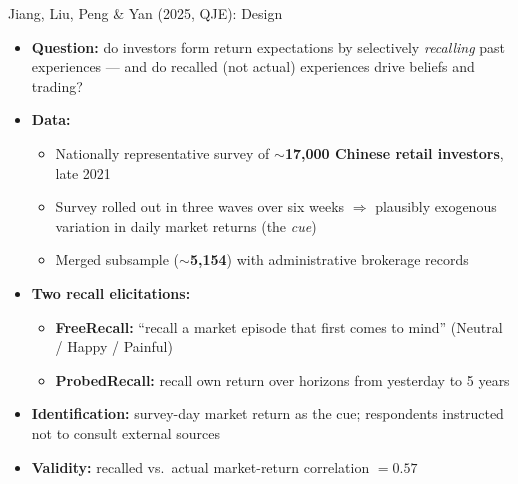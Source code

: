 \documentclass[aspectratio=169, 11pt]{beamer}
\begin{document}
\begin{frame}{Jiang, Liu, Peng \& Yan (2025, QJE): Design}
\begin{itemize}
\item \textbf{Question:} do investors form return expectations by selectively \emph{recalling} past experiences --- and do recalled (not actual) experiences drive beliefs and trading?
\item \textbf{Data:}
  \begin{itemize}
  \item Nationally representative survey of $\sim$\textbf{17,000 Chinese retail investors}, late 2021
  \item Survey rolled out in three waves over six weeks $\Rightarrow$ plausibly exogenous variation in daily market returns (the \emph{cue})
  \item Merged subsample ($\sim$\textbf{5,154}) with administrative brokerage records
  \end{itemize}
\item \textbf{Two recall elicitations:}
  \begin{itemize}
  \item \textbf{FreeRecall:} ``recall a market episode that first comes to mind'' (Neutral / Happy / Painful)
  \item \textbf{ProbedRecall:} recall own return over horizons from yesterday to 5 years
  \end{itemize}
\item \textbf{Identification:} survey-day market return as the cue; respondents instructed not to consult external sources
\item \textbf{Validity:} recalled vs.\ actual market-return correlation $= 0.57$
\end{itemize}
\end{frame}
\end{document}
